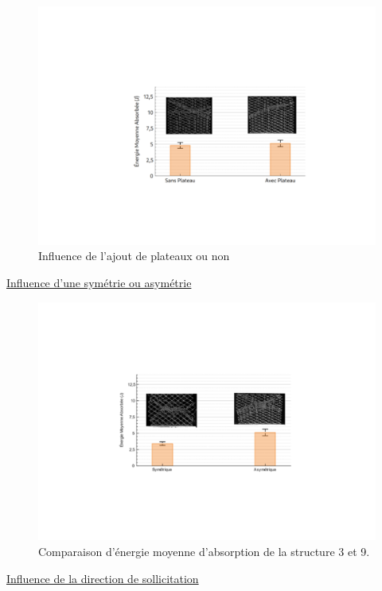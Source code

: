 \documentclass[a4paper]{article}
\begin{document}
	\begin{figure}[H]
		\centering
		\includegraphics[width=14cm]{Images/7/plateaux.pdf}
		\caption{Influence de l'ajout de plateaux ou non}
	\end{figure}
	
	\underline{Influence d'une symétrie ou asymétrie}\\
	
	\begin{figure}[H]
		\centering
		\includegraphics[width=16cm]{Images/7/sym_asym.pdf}
		\caption{Comparaison d’énergie moyenne d’absorption de la structure 3 et 9.}
	\end{figure}
	
	\underline{Influence de la direction de sollicitation}\\
	
\end{document}
